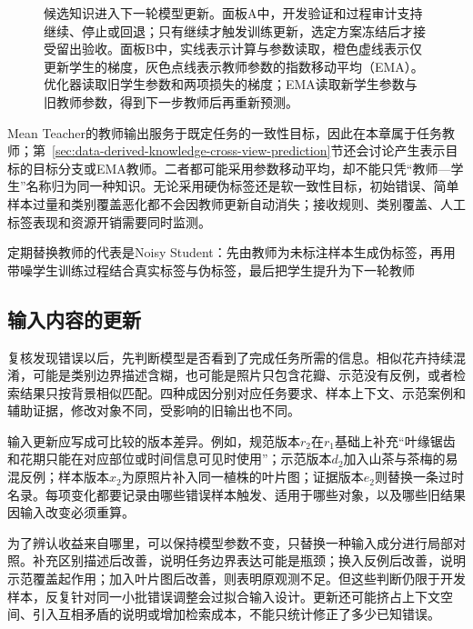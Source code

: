 \begin{figure}[!t]
  \centering
  
  \caption{候选知识进入下一轮模型更新。面板A中，开发验证和过程审计支持继续、停止或回退；只有继续才触发训练更新，选定方案冻结后才接受留出验收。面板B中，实线表示计算与参数读取，橙色虚线表示仅更新学生的梯度，灰色点线表示教师参数的指数移动平均（EMA）。优化器读取旧学生参数和两项损失的梯度；EMA读取新学生参数与旧教师参数，得到下一步教师后再重新预测。}
  \label{fig:knowledge-acquisition-iterative-update}
\end{figure}

Mean Teacher的教师输出服务于既定任务的一致性目标，因此在本章属于任务教师；第~\ref{sec:data-derived-knowledge-cross-view-prediction}节还会讨论产生表示目标的目标分支或EMA教师。二者都可能采用参数移动平均，却不能只凭“教师—学生”名称归为同一种知识。无论采用硬伪标签还是软一致性目标，初始错误、简单样本过量和类别覆盖恶化都不会因教师更新自动消失；接收规则、类别覆盖、人工标签表现和资源开销需要同时监测。

定期替换教师的代表是Noisy Student：先由教师为未标注样本生成伪标签，再用带噪学生训练过程结合真实标签与伪标签，最后把学生提升为下一轮教师

\subsection{输入内容的更新}
\label{sec:knowledge-acquisition-input-update}

复核发现错误以后，先判断模型是否看到了完成任务所需的信息。相似花卉持续混淆，可能是类别边界描述含糊，也可能是照片只包含花瓣、示范没有反例，或者检索结果只按背景相似匹配。四种成因分别对应任务要求、样本上下文、示范案例和辅助证据，修改对象不同，受影响的旧输出也不同。

输入更新应写成可比较的版本差异。例如，规范版本$r_2$在$r_1$基础上补充“叶缘锯齿和花期只能在对应部位或时间信息可见时使用”；示范版本$d_2$加入山茶与茶梅的易混反例；样本版本$x_2$为原照片补入同一植株的叶片图；证据版本$e_2$则替换一条过时名录。每项变化都要记录由哪些错误样本触发、适用于哪些对象，以及哪些旧结果因输入改变必须重算。

为了辨认收益来自哪里，可以保持模型参数不变，只替换一种输入成分进行局部对照。补充区别描述后改善，说明任务边界表达可能是瓶颈；换入反例后改善，说明示范覆盖起作用；加入叶片图后改善，则表明原观测不足。但这些判断仍限于开发样本，反复针对同一小批错误调整会过拟合输入设计。更新还可能挤占上下文空间、引入互相矛盾的说明或增加检索成本，不能只统计修正了多少已知错误。

